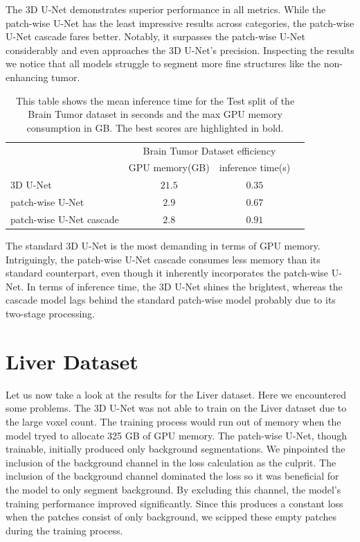 \noindent The 3D U-Net demonstrates superior performance in all metrics. While the patch-wise U-Net has the least impressive results across categories,
the patch-wise U-Net cascade fares better. Notably, it surpasses the patch-wise U-Net considerably and even approaches the 3D U-Net's precision.
Inspecting the results we notice that all models struggle to segment more fine structures like the non-enhancing tumor.
\newpage
\begin{table}[ht!]
\begin{center} {\footnotesize
\begin{tabular}{lccc}
\hline
	& \multicolumn{2}{c}{Brain Tumor Dataset efficiency} \\
	& \multicolumn{1}{c}{GPU memory(GB)} & \multicolumn{1}{c}{inference time(s)} \\
\hline
3D U-Net & $21.5$ & $\mathbf{0.35}$ \\[1ex]
patch-wise U-Net & $2.9$ & $0.67$ \\[1ex]
patch-wise U-Net cascade & $\mathbf{2.8}$ & $0.91$\\[1ex]
\hline
\end{tabular} }
\end{center}
\caption{\footnotesize This table shows the mean inference time for the Test split of the Brain Tumor dataset in seconds and the max GPU memory consumption in GB.
The best scores are highlighted in bold.}
\label{turns}
\end{table}

\noindent The standard 3D U-Net is the most demanding in terms of GPU memory. Intriguingly, the patch-wise U-Net cascade consumes less memory than its standard counterpart,
even though it inherently incorporates the patch-wise U-Net. In terms of inference time, the 3D U-Net shines the brightest, whereas the cascade model lags behind the standard patch-wise model probably due to its two-stage processing.

\section{Liver Dataset}
Let us now take a look at the results for the Liver dataset. Here we encountered some problems. The 3D U-Net was not able to train on the Liver dataset due to the large voxel count.
The training process would run out of memory when the model tryed to allocate 325 GB of GPU memory.
The patch-wise U-Net, though trainable, initially produced only background segmentations.
We pinpointed the inclusion of the background channel in the loss calculation as the culprit. The inclusion of the background channel dominated the loss so it was beneficial for the model to only segment background. By excluding this channel,
the model's training performance improved significantly. Since this produces a constant loss when the patches consist of only background, we scipped these empty patches during the training process.
\newpage

